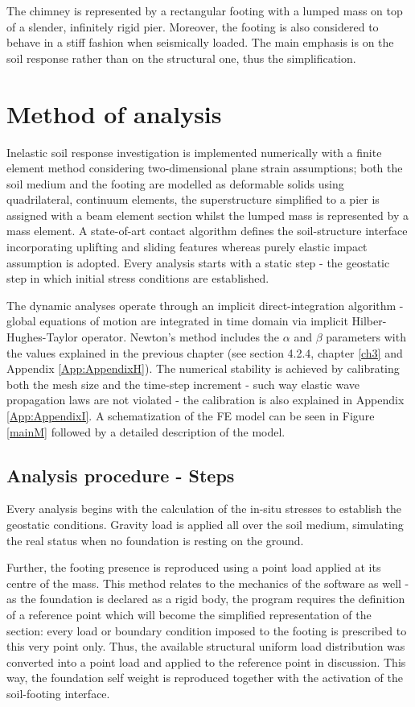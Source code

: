 	The chimney is represented by a rectangular footing with a lumped mass on top of a slender, infinitely rigid pier. Moreover, the footing is also considered to behave in a stiff fashion when seismically loaded. The main emphasis is on the soil response rather than on the structural one, thus the simplification.
	
\section{Method of analysis}
Inelastic soil response investigation is implemented numerically with a finite element method considering two-dimensional plane strain assumptions; both the soil medium and the footing are modelled as deformable solids using quadrilateral, continuum elements, the superstructure simplified to a pier is assigned with a beam element section whilst the lumped mass is represented by a mass element. A state-of-art contact algorithm defines the soil-structure interface incorporating uplifting and sliding features whereas purely elastic impact assumption is adopted. Every analysis starts with a static step - the geostatic step in which initial stress conditions are established.  

The dynamic analyses operate through an implicit direct-integration algorithm - global equations of motion are integrated in time domain via implicit Hilber-Hughes-Taylor operator. Newton's method includes the $\alpha$ and $\beta$ parameters with the values explained in the previous chapter (see section 4.2.4, chapter \ref{ch3} and Appendix \ref{App:AppendixH}). The numerical stability is achieved by calibrating both the mesh size and the time-step increment - such way elastic wave propagation laws are not violated - the calibration is also explained in Appendix \ref{App:AppendixI}. A schematization of the FE model can be seen in Figure \ref{mainM} followed by a detailed description of the model.

\subsection{Analysis procedure - Steps}
Every analysis begins with the calculation of the in-situ stresses to establish the geostatic conditions. Gravity load is applied all over the soil medium, simulating the real status when no foundation is resting on the ground. 

Further, the footing presence is reproduced using a point load applied at its centre of the mass. This method relates to the mechanics of the software as well - as the foundation is declared as a rigid body, the program requires the definition of a reference point which will become the simplified representation of the section: every load or boundary condition imposed to the footing is prescribed to this very point only. Thus, the available structural uniform load distribution was converted into a point load and applied to the reference point in discussion. This way, the foundation self weight is reproduced together with the activation of the soil-footing interface. 

